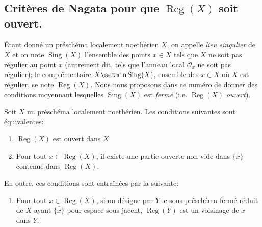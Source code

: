 \subsection{\texorpdfstring{Critères de Nagata pour que $\operatorname{Reg}(X)$ soit ouvert.}{Critères de Nagata pour que Reg(X) soit ouvert}}
\label{IV.2.s6.12-fr}

\begin{env}[6.12.1]
\label{IV.2.s6.12.1-fr}
Étant donné un préschéma localement noethérien $X$, on appelle \emph{lieu
singulier} de $X$ et on note $\operatorname{Sing}(X)$ l'ensemble des points
$x\in X$ tels que $X$ ne soit pas régulier au point $x$ (autrement dit,
tels que l'anneau local $\mathcal O_x$ ne soit pas régulier); le
complémentaire $X\setmin\operatorname{Sing}(X)$, ensemble des $x\in X$ où $X$ est
régulier, se note $\operatorname{Reg}(X)$. Nous nous proposons dans ce
numéro de donner des conditions moyennant lesquelles
$\operatorname{Sing}(X)$ est \emph{fermé} (i.e. $\operatorname{Reg}(X)$ \emph{ouvert}).
\end{env}

\begin{proposition}[6.12.2]
\label{IV.2.s6.12.2-fr}
Soit $X$ un préschéma localement noethérien. Les conditions suivantes sont
équivalentes:
\begin{enumerate}
\item[\textup{a)}] $\operatorname{Reg}(X)$ est ouvert dans $X$.
\item[\textup{b)}] Pour tout $x\in\operatorname{Reg}(X)$, il existe une partie
ouverte non vide dans $\overline{\{x\}}$ contenue dans
$\operatorname{Reg}(X)$.
\end{enumerate}
En outre, ces conditions sont entraînées par la suivante:
\begin{enumerate}
\item[\textup{c)}] Pour tout $x\in\operatorname{Reg}(X)$, si on désigne par $Y$ le
sous-préschéma fermé réduit de $X$ ayant $\overline{\{x\}}$ pour espace
sous-jacent, $\operatorname{Reg}(Y)$ est un voisinage de $x$ dans $Y$.
\end{enumerate}
\end{proposition}

